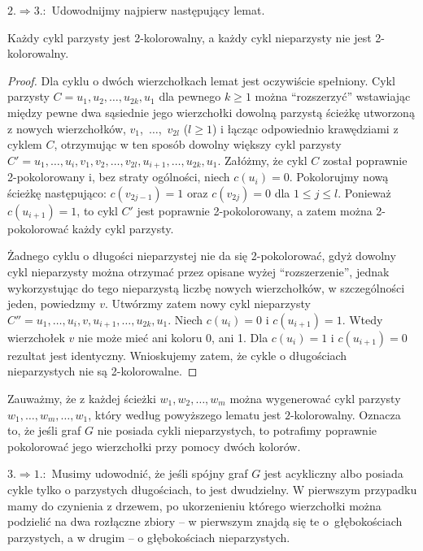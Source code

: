 $2.\Rightarrow 3.\!\!:$ Udowodnijmy najpierw następujący lemat.
\begin{lemat*}
	Każdy cykl parzysty jest \hbox{2-kolorowalny}, a każdy cykl nieparzysty nie jest \hbox{2-kolorowalny}.
\end{lemat*}
\begin{proof}
Dla cyklu o dwóch wierzchołkach lemat jest oczywiście spełniony. Cykl parzysty $C = u_1,u_2,\dots,u_{2k},u_1$ dla pewnego $k\ge1$ można ``rozszerzyć'' wstawiając między pewne dwa sąsiednie jego wierzchołki dowolną parzystą ścieżkę utworzoną z nowych wierzchołków, $v_1$,~$\dots$,~$v_{2l}$ ($l\ge1$) i łącząc odpowiednio krawędziami z cyklem $C$, otrzymując w ten sposób dowolny większy cykl parzysty $C' = u_1,\dots,u_i,v_1,v_2,\dots,v_{2l},u_{i+1},\dots,u_{2k},u_1$. Załóżmy, że cykl $C$ został poprawnie \hbox{2-pokolorowany} i, bez straty ogólności, niech $c(u_i)=0$. Pokolorujmy nową ścieżkę następująco: $c(v_{2j-1})=1$ oraz $c(v_{2j})=0$ dla $1\le j\le l$. Ponieważ $c(u_{i+1})=1$, to cykl $C'$ jest poprawnie \hbox{2-pokolorowany}, a zatem można \hbox{2-pokolorować} każdy cykl parzysty.

Żadnego cyklu o długości nieparzystej nie da się \hbox{2-pokolorować}, gdyż dowolny cykl nieparzysty można otrzymać przez opisane wyżej ``rozszerzenie'', jednak wykorzystując do tego nieparzystą liczbę nowych wierzchołków, w szczególności jeden, powiedzmy $v$. Utwórzmy zatem nowy cykl nieparzysty $C'' = u_1,\dots,u_i,v,u_{i+1},\dots,u_{2k},u_1$. Niech $c(u_i)=0$ i $c(u_{i+1})=1$. Wtedy wierzchołek $v$ nie może mieć ani koloru 0, ani 1. Dla $c(u_i)=1$ i $c(u_{i+1})=0$ rezultat jest identyczny. Wnioskujemy zatem, że cykle o długościach nieparzystych nie są \hbox{2-kolorowalne}.
\end{proof}

Zauważmy, że z każdej ścieżki $w_1,w_2,\dots,w_m$ można wygenerować cykl parzysty $w_1,\dots,w_m,\dots,w_1$, który według powyższego lematu jest $2$-kolorowalny. Oznacza to, że jeśli graf $G$ nie posiada cykli nieparzystych, to potrafimy poprawnie pokolorować jego wierzchołki przy pomocy dwóch kolorów.
\bigskip

$3.\Rightarrow 1.\!\!:$ Musimy udowodnić, że jeśli spójny graf $G$ jest acykliczny albo posiada cykle tylko o parzystych długościach, to jest dwudzielny. W pierwszym przypadku mamy do czynienia z drzewem, po ukorzenieniu którego wierzchołki można podzielić na dwa rozłączne zbiory -- w pierwszym znajdą się te o~głębokościach parzystych, a w drugim -- o głębokościach nieparzystych.

